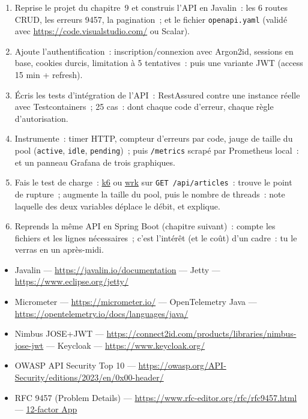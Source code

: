 \documentclass[12pt,a4paper,twoside,openright]{book}
\newcommand{\link}[2]{\href{#2}{#1}}
\begin{document}
\begin{exercice}
\begin{enumerate}
  \item Reprise le projet du chapitre~9 et construis l'API en Javalin~: les 6 routes CRUD, les
        erreurs 9457, la pagination~; et le fichier \verb|openapi.yaml| (valid\'e avec
        \url{https://code.visualstudio.com/} ou Scalar).
  \item Ajoute l'authentification~: inscription/connexion avec Argon2id, sessions en base,
        cookies durcis, limitation \`a 5 tentatives~: puis une variante JWT (access 15 min + refresh).
  \item \'Ecris les tests d'int\'egration de l'API~: RestAssured contre une instance r\'eelle avec
        Testcontainers~; 25 cas~: dont chaque code d'erreur, chaque r\`egle d'autorisation.
  \item Instrumente~: timer HTTP, compteur d'erreurs par code, jauge de taille du pool
        (\verb|active|, \verb|idle|, \verb|pending|)~; puis \verb|/metrics| scrap\'e par Prometheus
        local~: et un panneau Grafana de trois graphiques.
  \item Fais le test de charge~: \link{k6}{https://k6.io/} ou \link{wrk}{https://github.com/wg/wrk}
        sur \verb|GET /api/articles|~: trouve le point de rupture~; augmente la taille du pool,
        puis le nombre de threads~: note laquelle des deux variables d\'eplace le d\'ebit, et explique.
  \item Reprends la m\^eme API en Spring Boot (chapitre suivant)~: compte les fichiers et les lignes
        n\'ecessaires~; c'est l'int\'er\^et (et le co\^ut) d'un cadre~: tu le verras en un apr\`es-midi.
\end{enumerate}
\end{exercice}

\begin{ressources}
\begin{itemize}
  \item Javalin --- \url{https://javalin.io/documentation} --- Jetty --- \url{https://www.eclipse.org/jetty/}
  \item Micrometer --- \url{https://micrometer.io/} --- OpenTelemetry Java --- \url{https://opentelemetry.io/docs/languages/java/}
  \item Nimbus JOSE+JWT --- \url{https://connect2id.com/products/libraries/nimbus-jose-jwt} --- Keycloak --- \url{https://www.keycloak.org/}
  \item OWASP API Security Top 10 --- \url{https://owasp.org/API-Security/editions/2023/en/0x00-header/}
  \item RFC 9457 (Problem Details) --- \url{https://www.rfc-editor.org/rfc/rfc9457.html} --- \link{12-factor App}{https://12factor.net/fr/}
\end{itemize}
\end{ressources}
\end{document}
